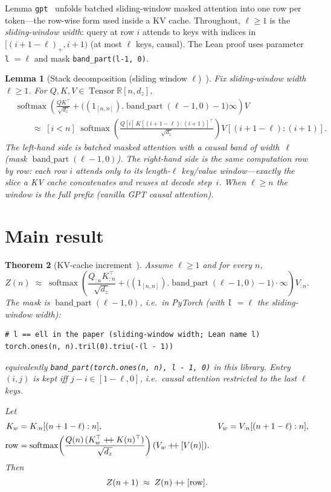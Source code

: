 \documentclass[11pt,a4paper]{article}
\newtheorem{theorem}{Theorem}[section]
\newtheorem{lemma}[theorem]{Lemma}
\newcommand{\Tensor}{\operatorname{Tensor}}
\newcommand{\bandpart}{\operatorname{band\_part}}
\newcommand{\rowop}{\operatorname{row}}
\newcommand{\concat}{\mathbin{+\mkern-4mu+}}
\newcommand{\XEq}{\approx}
\begin{document}
Lemma \texttt{gpt}~\cite{lemma_gpt} unfolds batched sliding-window masked attention into one row per token---the row-wise form used inside a KV cache.
Throughout, $\ell\ge 1$ is the \emph{sliding-window width}: query at row $i$ attends to keys with indices in $[(i+1-\ell)_+,i+1)$ (at most $\ell$ keys, causal).
The Lean proof uses parameter \texttt{l} $=\ell$ and mask \texttt{band\_part(l-1, 0)}.

\begin{lemma}[Stack decomposition (sliding window $\ell$)~\cite{lemma_gpt}]
\label{lem:gpt}
Fix sliding-window width $\ell\ge 1$.
For $Q,K,V\in\Tensor\mathbb{R}[n,d_z]$,
\begin{align*}
&\operatorname{softmax}\!\left(
\frac{QK^{\top}}{\sqrt{d_z}}
+\bigl((1_{[n,n]}).\bandpart(\ell-1,0)-1\bigr)\infty
\right)V \\
&\qquad\XEq\;
[i<n]\;
\operatorname{softmax}\!\left(\frac{Q[i]\,K[(i+1-\ell):(i+1)]^{\top}}{\sqrt{d_z}}\right)
V[(i+1-\ell):(i+1)].
\end{align*}
The left-hand side is batched masked attention with a causal band of width~$\ell$ (mask $\bandpart(\ell-1,0)$).
The right-hand side is the same computation row by row: each row $i$ attends only to its length-$\ell$ key/value window---exactly the slice a KV cache concatenates and reuses at decode step~$i$.
When $\ell\ge n$ the window is the full prefix (vanilla GPT causal attention).
\end{lemma}

\section{Main result}
\label{sec:main}

\begin{theorem}[KV-cache increment~\cite{lemma_kv_cache_lean}]
\label{thm:kv-cache}
Assume $\ell\ge 1$ and for every $n$,
\begin{equation}
\label{eq:hyp}
Z(n)\;\XEq\;
\operatorname{softmax}\!\left(
\frac{Q_{:n}K_{:n}^{\top}}{\sqrt{d_z}}
+\bigl((1_{[n,n]}).\bandpart(\ell-1,0)-1\bigr)\cdot\infty
\right)
V_{:n}.
\end{equation}
The mask is $\bandpart(\ell-1,0)$, i.e.\ in PyTorch (with \texttt{l} $=\ell$ the sliding-window width):
\begin{verbatim}
# l == ell in the paper (sliding-window width; Lean name l)
torch.ones(n, n).tril(0).triu(-(l - 1))
\end{verbatim}
\noindent
equivalently \texttt{band\_part(torch.ones(n, n), l - 1, 0)} in this library.
Entry $(i,j)$ is kept iff $j-i\in[1-\ell,0]$, i.e.\ causal attention restricted to the last $\ell$ keys.

Let
\begin{align*}
K_w&=K_{:n}[(n+1-\ell):n],&
V_w&=V_{:n}[(n+1-\ell):n],\\
\rowop&=
\operatorname{softmax}\!\left(\frac{Q(n)\,(K_w^{\top}\concat K(n)^{\top})}{\sqrt{d_z}}\right)
(V_w\concat[V(n)]).
\end{align*}
Then
\begin{equation}
\label{eq:conc}
Z(n+1)\;\XEq\; Z(n)\concat[\rowop].
\end{equation}
\end{theorem}
\end{document}
